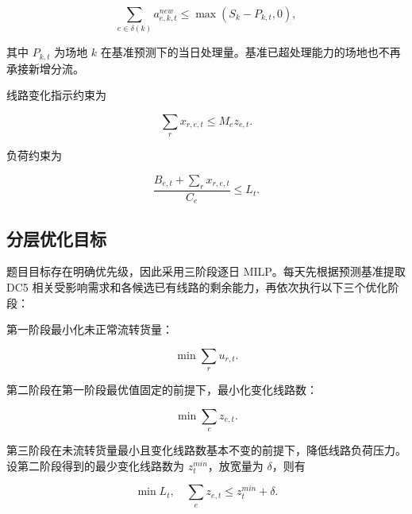 \documentclass[UTF8,zihao=-4,a4paper,fontset=fandol]{ctexart}
\begin{document}
\begin{equation}
\sum_{e\in \delta(k)} a^{new}_{e,k,t} \le \max(S_k-P_{k,t},0),
\end{equation}



其中 $P_{k,t}$ 为场地 $k$ 在基准预测下的当日处理量。基准已超处理能力的场地也不再承接新增分流。



线路变化指示约束为



\begin{equation}
\sum_r x_{r,e,t}\le M_e z_{e,t}.
\end{equation}



负荷约束为



\begin{equation}
\frac{B_{e,t}+\sum_r x_{r,e,t}}{C_e}\le L_t.
\end{equation}



\subsection{分层优化目标}



题目目标存在明确优先级，因此采用三阶段逐日 MILP。每天先根据预测基准提取 DC5 相关受影响需求和各候选已有线路的剩余能力，再依次执行以下三个优化阶段：



第一阶段最小化未正常流转货量：



\begin{equation}
\min \sum_r u_{r,t}.
\end{equation}



第二阶段在第一阶段最优值固定的前提下，最小化变化线路数：



\begin{equation}
\min \sum_e z_{e,t}.
\end{equation}



第三阶段在未流转货量最小且变化线路数基本不变的前提下，降低线路负荷压力。设第二阶段得到的最少变化线路数为 $z_t^{min}$，放宽量为 $\delta$，则有



\begin{equation}
\min L_t,\quad \sum_e z_{e,t}\le z_t^{min}+\delta.
\end{equation}
\end{document}
